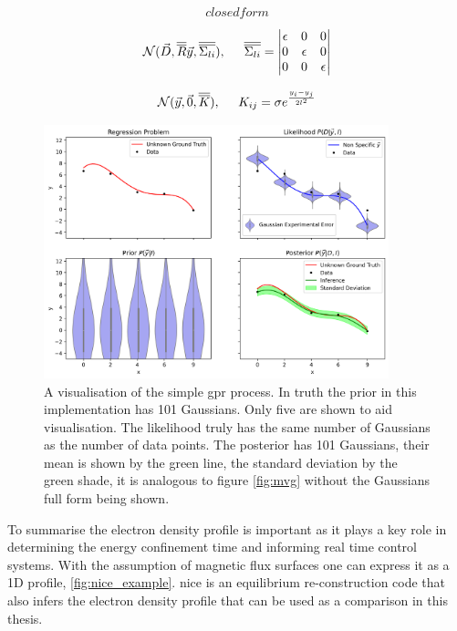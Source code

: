 \begin{equation}
  closed form
  \label{eq:closedform}
\end{equation}

\begin{equation}
    \mathcal{N}(\Vec{D}, \overline{\overline{R}}\Vec{y}, \overline{\overline{\Sigma_{li}}}),\hspace{0.5cm} \overline{\overline{\Sigma_{li}}} = 
      \begin{vmatrix}
          \epsilon & 0 & 0\\
          0 & \epsilon & 0\\
          0 & 0 & \epsilon
      \end{vmatrix}
    \label{eq:likelihood}
\end{equation}

\begin{equation}
  \mathcal{N}(\Vec{y}, \Vec{0}, \overline{\overline{K}}),\hspace{0.5cm} K_{ij} = \sigma e^{\frac{y_i - y_j}{2l^2}}
  \label{eq:prior}
\end{equation}

\begin{figure}
  \centering
  \includegraphics[width=10cm]{images/gprvis.png}
  \caption{A visualisation of the simple \gls{gpr} process. In truth the prior in this implementation has 101 Gaussians. Only five are shown to aid visualisation. The likelihood truly has the same number of Gaussians as the number of data points. The posterior has 101 Gaussians, their mean is shown by the green line, the standard deviation by the green shade, it is analogous to figure \ref{fig:mvg} without the Gaussians full form being shown.}
  \label{fig:gprvis}
\end{figure}

To summarise the electron density profile is important as it plays a key role in determining the energy confinement time and informing real time control systems. With the assumption of magnetic flux surfaces one can express it as a 1D profile, \ref{fig:nice_example}. \gls{nice} is an equilibrium re-construction code that also infers the electron density profile that can be used as a comparison in this thesis. 

